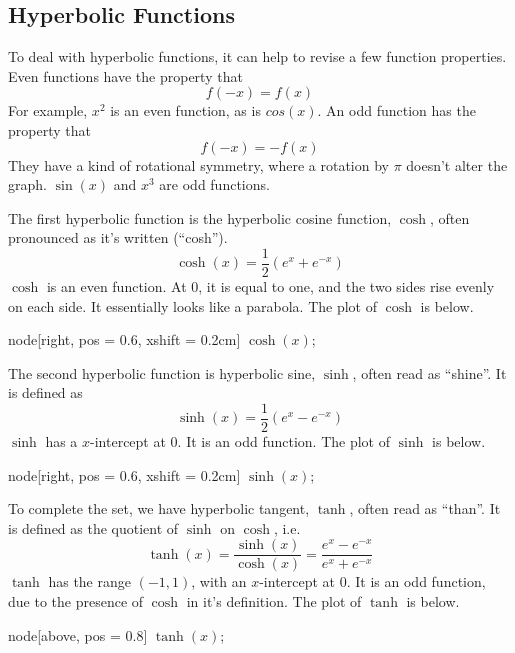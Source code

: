 \documentclass[12pt]{report}
\begin{document}
\begin{flushleft}
\section*{Hyperbolic Functions}

To deal with hyperbolic functions, it can help to revise a few function 
properties. Even functions have the property that
\[f(-x) = f(x)\]
For example, \(x^2\) is an even function, as is \(cos(x)\). An odd function
has the property that
\[f(-x) = -f(x)\]
They have a kind of rotational symmetry, where a rotation by \(\pi\) doesn't
alter the graph. \(\sin(x)\) and \(x^3\) are odd functions.

\bigskip
The first hyperbolic function is the hyperbolic cosine function, \(\cosh\), 
often pronounced as it's written (``cosh'').
\[\cosh(x) = \frac{1}{2}(e^x + e^{-x})\]
\(\cosh\) is an even function. At \(0\), it is equal to one, and the two sides
rise evenly on each side. It essentially looks like a parabola. 
The plot of \(\cosh\) is below.

\begin{plot}[
    xmin = -3,
    xmax = 3,
    ymin = -1,
    ymax = 6
]
    node[right, pos = 0.6, xshift = 0.2cm] {\(\cosh(x)\)};
\end{plot}

The second hyperbolic function is hyperbolic sine, \(\sinh\), often read as
``shine''. It is defined as
\[\sinh(x) = \frac{1}{2}(e^x - e^{-x})\]
\(\sinh\) has a \(x\)-intercept at \(0\). It is an odd function. The plot of
\(\sinh\) is below.

\begin{plot}[
    xmin = -3,
    xmax = 3,
    ymin = -6,
    ymax = 6
]
    node[right, pos = 0.6, xshift = 0.2cm] {\(\sinh(x)\)};
\end{plot}

To complete the set, we have hyperbolic tangent, \(\tanh\), often read as 
``than''. It is defined as the quotient of \(\sinh\) on \(\cosh\), i.e.
\[\tanh(x) = \frac{\sinh(x)}{\cosh(x)} = \frac{e^x - e^{-x}}{e^x + e^{-x}}\]
\(\tanh\) has the range \((-1, 1)\), with an \(x\)-intercept at \(0\). It is an
odd function, due to the presence of \(\cosh\) in it's definition. The plot of
\(\tanh\) is below.

\begin{plot}[
    xmin = -5,
    xmax = 5,
    ymin = -2,
    ymax = 2
]
    node[above, pos = 0.8] {\(\tanh(x)\)};
\end{plot}


\end{flushleft}
\end{document}
